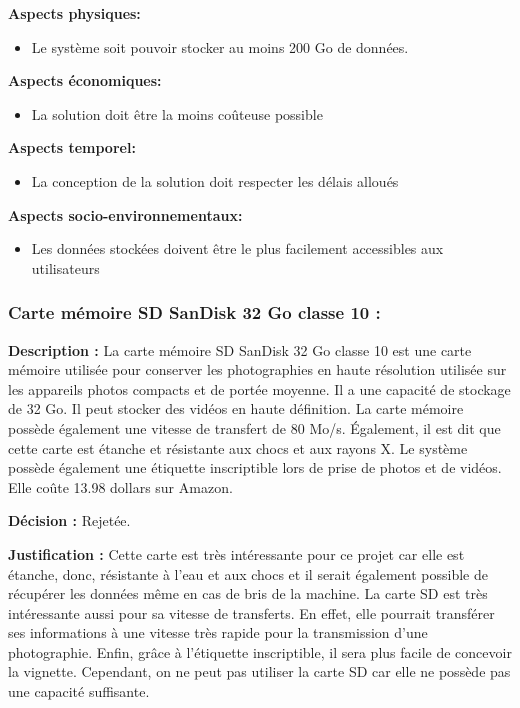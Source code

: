 \textbf{Aspects physiques:}
\begin{itemize} [label = {--}]
    \item Le système soit pouvoir stocker au moins 200 Go de données.
\end{itemize}

\textbf{Aspects économiques:}
\begin{itemize} [label = {--}]
    \item La solution doit être la moins coûteuse possible
\end{itemize}

\textbf{Aspects temporel:}
\begin{itemize} [label = {--}]
    \item La conception de la solution doit respecter les délais alloués
\end{itemize}

\textbf{Aspects socio-environnementaux:}
\begin{itemize} [label = {--}]
    \item Les données stockées doivent être le plus facilement accessibles aux utilisateurs
\end{itemize}

\subsubsection{Carte mémoire SD SanDisk 32 Go classe 10 :}

\textbf{Description :} La carte mémoire SD SanDisk 32 Go classe 10 est une carte mémoire utilisée pour conserver les photographies en haute résolution utilisée sur les appareils photos compacts et de portée moyenne. Il a une capacité de stockage de 32 Go. Il peut stocker des vidéos en haute définition. La carte mémoire possède également une vitesse de transfert de 80 Mo/s. Également, il est dit que cette carte est étanche et résistante aux chocs et aux rayons X. Le système possède également une étiquette inscriptible lors de prise de photos et de vidéos. Elle coûte 13.98 dollars sur Amazon.

\textbf{Décision :} Rejetée.

\textbf{Justification :} Cette carte est très intéressante pour ce projet car elle est étanche, donc, résistante à l’eau et aux chocs et il serait également possible de récupérer les données même en cas de bris de la machine. La carte SD est très intéressante aussi pour sa vitesse de transferts. En effet, elle pourrait transférer ses informations à une vitesse très rapide pour la transmission d’une photographie. Enfin, grâce à l’étiquette inscriptible, il sera plus facile de concevoir la vignette. Cependant, on ne peut pas utiliser la carte SD car elle ne possède pas une capacité suffisante.

